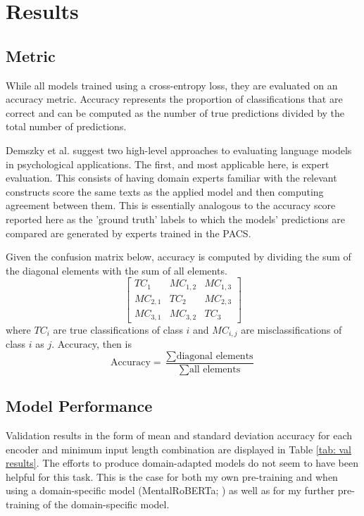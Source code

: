 \documentclass[12pt]{report}
\begin{document}
\section{Results}
\subsection*{Metric}
While all models trained using a cross-entropy loss, they are evaluated on an accuracy metric.
Accuracy represents the proportion of classifications that are correct and can be computed as the number of true predictions divided by the total number of predictions.

Demszky et al. \citeyear{Demszky2023} suggest two high-level approaches to evaluating language models in psychological applications.
The first, and most applicable here, is expert evaluation.
This consists of having domain experts familiar with the relevant constructs score the same texts as the applied model and then computing agreement between them.
This is essentially analogous to the accuracy score reported here as the 'ground truth' labels to which the models' predictions are compared are generated by experts trained in the PACS.

Given the confusion matrix below, accuracy is computed by dividing the sum of the diagonal elements with the sum of all elements.
$$
\begin{bmatrix} TC_1 & MC_{1,2} & MC_{1,3} \\ MC_{2,1} & TC_2 & MC_{2,3} \\ MC_{3,1} & MC_{3,2} & TC_3 \end{bmatrix}
$$
where $TC_i$ are true classifications of class $i$ and $MC_{i,j}$ are misclassifications of class $i$ as $j$.
Accuracy, then is
$$\text{Accuracy} = \frac{\sum \text{diagonal elements}}{\sum \text{all elements}}$$

\subsection*{Model Performance}
Validation results in the form of mean and standard deviation accuracy for each encoder and minimum input length combination are displayed in Table \ref{tab: val results}.
The efforts to produce domain-adapted models do not seem to have been helpful for this task.
This is the case for both my own pre-training and when using a domain-specific model (MentalRoBERTa; ) as well as for my further pre-training of the domain-specific model.
\end{document}
